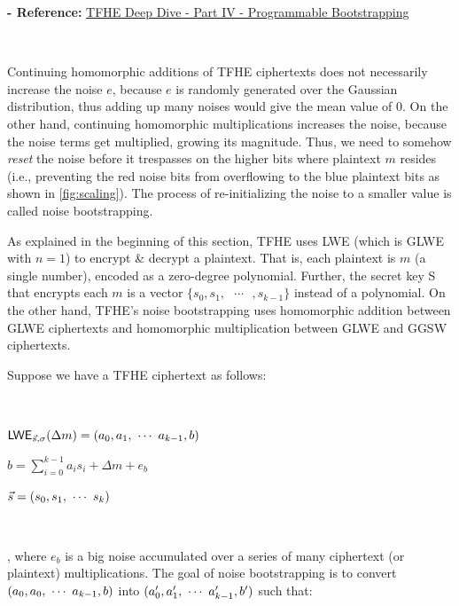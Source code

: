 \textbf{- Reference:} 
\href{https://www.zama.ai/post/tfhe-deep-dive-part-4}{TFHE Deep Dive - Part IV - Programmable Bootstrapping}~\cite{tfhe-4}

$ $

Continuing homomorphic additions of TFHE ciphertexts does not necessarily increase the noise $e$, because $e$ is randomly generated over the Gaussian distribution, thus adding up many noises would give the mean value of 0. On the other hand, continuing homomorphic multiplications increases the noise, because the noise terms get multiplied, growing its magnitude. Thus, we need to somehow \textit{reset} the noise before it trespasses on the higher bits where plaintext $m$ resides (i.e., preventing the red noise bits from overflowing to the blue plaintext bits as shown in \autoref{fig:scaling}). The process of re-initializing the noise to a smaller value is called noise bootstrapping.

As explained in the beginning of this section, TFHE uses LWE (which is GLWE with $n = 1$) to encrypt \& decrypt a plaintext. That is, each plaintext is $m$ (a single number), encoded as a zero-degree polynomial. Further, the secret key S that encrypts each $m$ is a vector $ \{s_0, s_1, \text{ } \cdots \text{ }, s_{k-1} \}$ instead of a polynomial. On the other hand, TFHE's noise bootstrapping uses homomorphic addition between GLWE ciphertexts and homomorphic multiplication between GLWE and GGSW ciphertexts.  


Suppose we have a TFHE ciphertext as follows: 

$ $

$\textsf{LWE}_{\vec{s}, \sigma}(\Delta m) = (a_0, a_1, \text{ } \text{$\cdots$} \text{ } a_{k-1}, b)$

$b = \sum\limits_{i=0}^{k-1} a_is_i + \Delta m + e_b$

$\vec{s} = (s_0, s_1, \text{ } \text{$\cdots$} \text{ } s_k)$

$ $

, where $e_b$ is a big noise accumulated over a series of many ciphertext (or plaintext) multiplications. The goal of noise bootstrapping is to convert $(a_0, a_0, \text{ } \text{$\cdots$} \text{ } a_{k-1}, b)$ into $(a_0', a_1', \text{ } \text{$\cdots$} \text{ } a_{k-1}', b')$ such that: 

